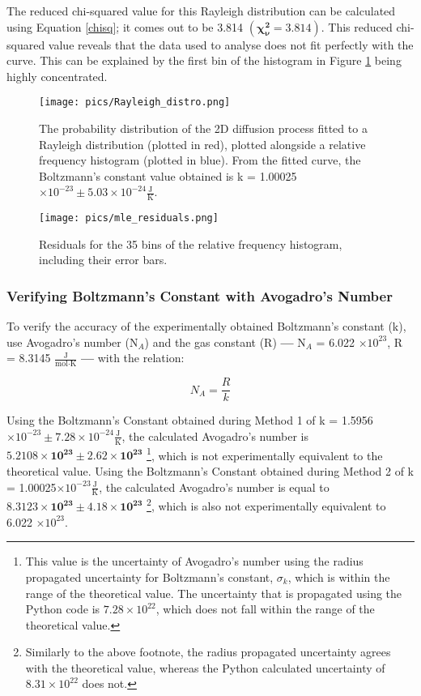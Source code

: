 \documentclass[12pt, letterpaper, twoside]{article}
\begin{document}
The reduced chi-squared value for this Rayleigh distribution can be calculated using Equation \ref{chisq}; it comes out to be 3.814 $\bm{(\chi_{\nu}^2 = 3.814)}$. This reduced chi-squared value reveals that the data used to analyse does not fit perfectly with the curve. This can be explained by the first bin of the histogram in Figure \ref{fig:rayleigh} being highly concentrated.

\begin{figure}[!ht]
    \centering
    \texttt{[image: pics/Rayleigh\_distro.png]}
    \caption{The probability distribution of the 2D diffusion process fitted to a Rayleigh distribution (plotted in red), plotted alongside a relative frequency histogram (plotted in blue). From the fitted curve, the Boltzmann's constant value obtained is k = 1.00025 $\times 10^{-23} \pm 5.03 \times 10^{-24} \frac{\text{J}}{\text{K}}$.}
    \label{fig:rayleigh}
\end{figure}

\begin{figure}[!ht]
    \centering
    \texttt{[image: pics/mle\_residuals.png]}
    \caption{Residuals for the 35 bins of the relative frequency histogram, including their error bars.}
    \label{fig:mle_residuals}
\end{figure}

 \vfill\pagebreak

 \subsubsection*{Verifying Boltzmann's Constant with Avogadro's Number}

To verify the accuracy of the experimentally obtained Boltzmann's constant (k), use Avogadro's number (N$_A$) and the gas constant (R) \textbf{---} N$_A$ = 6.022 $\times 10^{23}$, R = 8.3145 $\frac{\text{J}}{\text{mol}\cdot\text{K}}$ \textbf{---} with the relation:

\begin{equation}
    N_A = \frac{R}{k}
\end{equation}

Using the Boltzmann's Constant obtained during Method 1 of k = 1.5956 $\times 10^{-23} \pm 7.28 \times 10^{-24} \frac{\text{J}}{\text{K}}$, the calculated Avogadro’s number is $\bm{5.2108\times 10^{23} \pm 2.62 \times 10^{23}}$ \footnote[3]{This value is the uncertainty of Avogadro's number using the radius propagated uncertainty for Boltzmann's constant, $\sigma_k$, which is within the range of the theoretical value. The uncertainty that is propagated using the Python code is $7.28\times 10^{22}$, which does not fall within the range of the theoretical value.}, which is not experimentally equivalent to the theoretical  value. Using the Boltzmann's Constant obtained during Method 2 of k = 1.00025$\times 10^{-23} \frac{\text{J}}{\text{K}}$, the calculated Avogadro's number is equal to $\bm{8.3123\times 10^{23} \pm 4.18 \times 10^{23}}$ \footnote[4]{Similarly to the above footnote, the radius propagated uncertainty agrees with the theoretical value, whereas the Python calculated uncertainty of $8.31 \times 10^{22}$ does not.}, which is also not experimentally equivalent to 6.022 $\times10^{23}$.
\end{document}
